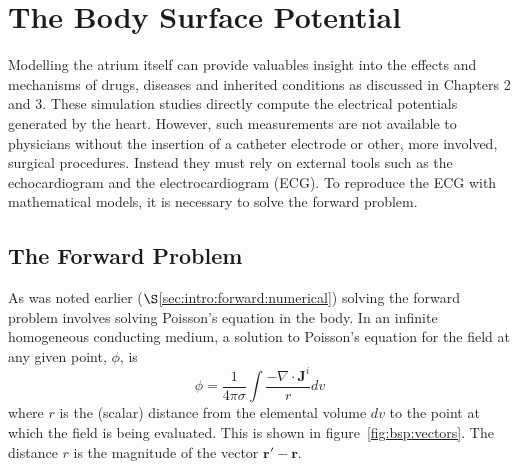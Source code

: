 \chapter{The Body Surface Potential}


Modelling the atrium itself can provide valuables insight into the effects and
mechanisms of drugs, diseases and inherited conditions as discussed in Chapters 2 and 3.
These simulation studies directly compute the electrical potentials generated by the heart.
However, such measurements are not available to physicians without the
insertion of a catheter electrode or other, more involved, surgical procedures.
Instead they must rely on external tools such as the echocardiogram and the
electrocardiogram (ECG).
To reproduce the ECG with mathematical models, it is necessary to solve the forward problem.

\section{The Forward Problem}

As was noted earlier ($\S$\ref{sec:intro:forward:numerical}) solving the forward
problem involves solving Poisson's equation in the body.
In an infinite homogeneous conducting medium, a solution to Poisson's equation
for the field at any given point, $\phi$, is~\cite{Plonsey1963}
\begin{equation}
\label{eqn:bsp:infinite}
\phi = \frac{1}{4 \pi \sigma} \int \frac{- \nabla \cdot
\mathbf{J}^{i} }{r} dv
\end{equation}
where $r$ is the (scalar) distance from the elemental volume $dv$ to the point at
which the field is being evaluated.
This is shown in figure~\ref{fig:bsp:vectors}.
The distance $r$ is the magnitude of the vector $\mathbf{r'}-\mathbf{r}$.


